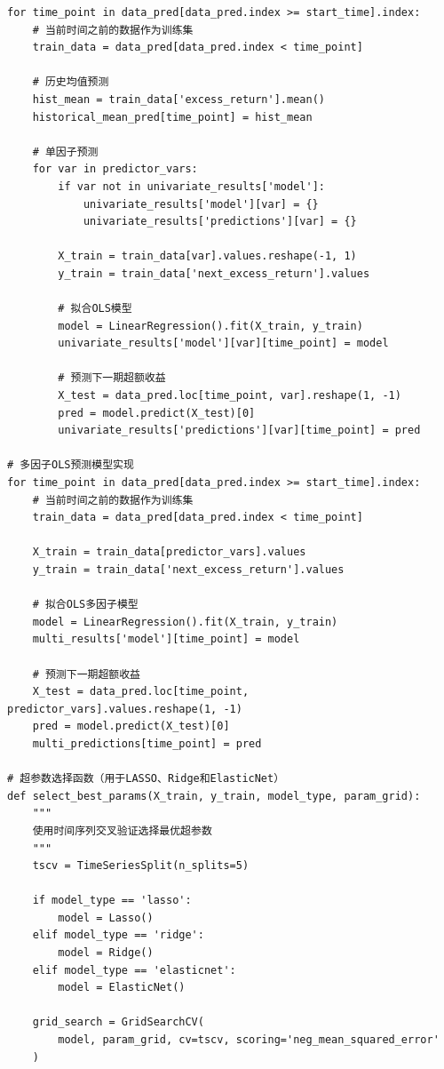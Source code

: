 \documentclass[12pt, a4paper]{article}
\begin{document}
\begin{lstlisting}[basicstyle=\small\ttfamily, breaklines=true, columns=fullflexible]
for time_point in data_pred[data_pred.index >= start_time].index:
    # 当前时间之前的数据作为训练集
    train_data = data_pred[data_pred.index < time_point]
    
    # 历史均值预测
    hist_mean = train_data['excess_return'].mean()
    historical_mean_pred[time_point] = hist_mean
    
    # 单因子预测
    for var in predictor_vars:
        if var not in univariate_results['model']:
            univariate_results['model'][var] = {}
            univariate_results['predictions'][var] = {}
        
        X_train = train_data[var].values.reshape(-1, 1)
        y_train = train_data['next_excess_return'].values
        
        # 拟合OLS模型
        model = LinearRegression().fit(X_train, y_train)
        univariate_results['model'][var][time_point] = model
        
        # 预测下一期超额收益
        X_test = data_pred.loc[time_point, var].reshape(1, -1)
        pred = model.predict(X_test)[0]
        univariate_results['predictions'][var][time_point] = pred

# 多因子OLS预测模型实现
for time_point in data_pred[data_pred.index >= start_time].index:
    # 当前时间之前的数据作为训练集
    train_data = data_pred[data_pred.index < time_point]
    
    X_train = train_data[predictor_vars].values
    y_train = train_data['next_excess_return'].values
    
    # 拟合OLS多因子模型
    model = LinearRegression().fit(X_train, y_train)
    multi_results['model'][time_point] = model
    
    # 预测下一期超额收益
    X_test = data_pred.loc[time_point, predictor_vars].values.reshape(1, -1)
    pred = model.predict(X_test)[0]
    multi_predictions[time_point] = pred

# 超参数选择函数（用于LASSO、Ridge和ElasticNet）
def select_best_params(X_train, y_train, model_type, param_grid):
    """
    使用时间序列交叉验证选择最优超参数
    """
    tscv = TimeSeriesSplit(n_splits=5)
    
    if model_type == 'lasso':
        model = Lasso()
    elif model_type == 'ridge':
        model = Ridge()
    elif model_type == 'elasticnet':
        model = ElasticNet()
    
    grid_search = GridSearchCV(
        model, param_grid, cv=tscv, scoring='neg_mean_squared_error'
    )
    

\end{lstlisting}
\end{document}
